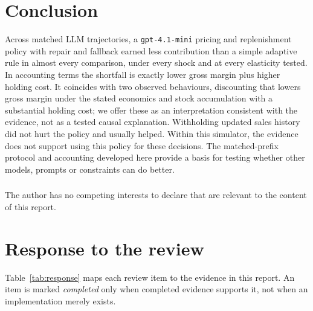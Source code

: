 \documentclass[runningheads]{llncs}
\begin{document}
\section{Conclusion}

Across  matched LLM trajectories, a \texttt{gpt-4.1-mini} pricing and replenishment policy with repair and fallback earned less contribution than a simple adaptive rule in almost every comparison, under every shock and at every elasticity tested. In accounting terms the shortfall is exactly lower gross margin plus higher holding cost. It coincides with two observed behaviours, discounting that lowers gross margin under the stated economics and stock accumulation with a substantial holding cost; we offer these as an interpretation consistent with the evidence, not as a tested causal explanation. Withholding updated sales history did not hurt the policy and usually helped. Within this simulator, the evidence does not support using this policy for these decisions. The matched-prefix protocol and accounting developed here provide a basis for testing whether other models, prompts or constraints can do better.

\begin{credits}
\subsubsection{\discintname}
The author has no competing interests to declare that are relevant to the content of this report.
\end{credits}


\begingroup\raggedright

\endgroup

\clearpage
\appendix

\section{Response to the review}\label{app:response}

Table~\ref{tab:response} maps each review item to the evidence in this report. An item is marked \emph{completed} only when completed evidence supports it, not when an implementation merely exists.
\end{document}
